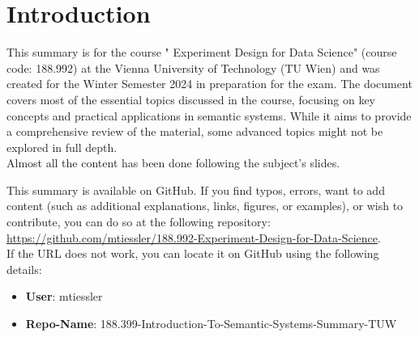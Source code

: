 \section{Introduction}

\noindent This summary is for the course " Experiment Design for Data
Science" (course code: 188.992) at the Vienna University of Technology (TU Wien) and was created for the Winter Semester 2024 in preparation for the exam. The document covers most of the essential topics discussed in the course, focusing on key concepts and practical applications in semantic systems. While it aims to provide a comprehensive review of the material, some advanced topics might not be explored in full depth.\\

Almost all the content has been done following the subject's slides.

This summary is available on GitHub. If you find typos, errors, want to add content (such as additional explanations, links, figures, or examples), or wish to contribute, you can do so at the following repository:\\
\url{https://github.com/mtiessler/188.992-Experiment-Design-for-Data-Science}.\\[1em]
If the URL does not work, you can locate it on GitHub using the following details:
\begin{itemize}
    \item \textbf{User}: mtiessler
    \item \textbf{Repo-Name}: 188.399-Introduction-To-Semantic-Systems-Summary-TUW
\end{itemize}

\newpage

